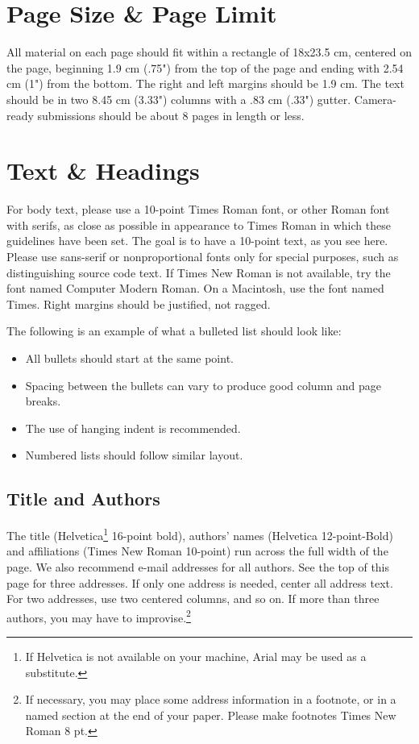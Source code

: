 	\section{Page Size \& Page Limit}
	All material on each page should fit within a rectangle of 18x23.5
	cm, centered on the page, beginning 1.9 cm (.75") from the top of
	the page and ending with 2.54 cm (1") from the bottom. The right
	and left margins should be 1.9 cm. The text should be in two 8.45
	cm (3.33") columns with a .83 cm (.33") gutter. Camera-ready
	submissions should be about 8 pages in length or less.
	
	\section{Text \& Headings}
	For body text, please use a 10-point Times Roman font, or other
	Roman font with serifs, as close as possible in appearance to
	Times Roman in which these guidelines have been set. The goal is
	to have a 10-point text, as you see here. Please use sans-serif or 
	nonproportional fonts only for special purposes, such as
	distinguishing source code text. If Times New Roman is not available,
	try the font named Computer Modern Roman. On a Macintosh, use the
	font named Times. Right margins should be justified, not ragged.
	\par
	The following is an example of what a bulleted list should look like:
	\begin{itemize}
		\item All bullets should start at the same point.
		\item Spacing between the bullets can vary to produce
			  good column and page breaks.
		\item The use of hanging indent is recommended.
		\item Numbered lists should follow similar layout.
	\end{itemize}
	
	\subsection{Title and Authors}
	The title (Helvetica\footnote{If Helvetica is not available on your
	machine, Arial may be used as a substitute.} 16-point bold), authors’
	names (Helvetica 12-point-Bold) and affiliations (Times New Roman
	10-point) run across the full width of the page. We also recommend
	e-mail addresses for all authors. See the top of this page for three
	addresses. If only one address is needed, center all address text.
	For two addresses, use two centered columns, and so on. If more than
	three authors, you may have to improvise.\footnote{If necessary, you
	may place some address information in a footnote, or in a named section
	at the end of your paper. Please make footnotes Times New Roman 8 pt.}
	

